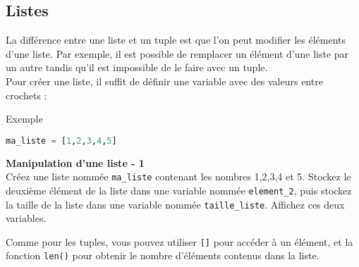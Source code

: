     \subsection{Listes}
    La différence entre une liste et un tuple est que l'on peut modifier les éléments d'une liste. Par exemple, il est possible de remplacer un élément d'une liste par un autre tandis qu'il est impossible de le faire avec un tuple.
    \\
    Pour créer une liste, il suffit de définir une variable avec des valeurs entre crochets :
    \begin{Example}{\faTerminal \quad Exemple}
        \begin{lstlisting}[language=Python]
            ma_liste = [1,2,3,4,5]   \end{lstlisting}
    \end{Example}
    
     \begin{Exercice}[5 minutes] \textbf{Manipulation d'une liste - 1}\\
        Créez une liste nommée \lstinline{ma_liste} contenant les nombres 1,2,3,4 et 5. Stockez le deuxième élément de la liste dans une variable nommée \lstinline{element_2}, puis stockez la taille de la liste dans une variable nommée \lstinline{taille_liste}. Affichez ces deux variables.\\
    
        \begin{conseil}
            Comme pour les tuples, vous pouvez utiliser \lstinline{[]} pour accéder à un élément, et la fonction \lstinline{len()} pour obtenir le nombre d'éléments contenus dans la liste.
        \end{conseil}
        
        \begin{solution}
             
        \end{solution}
    \end{Exercice}
    
